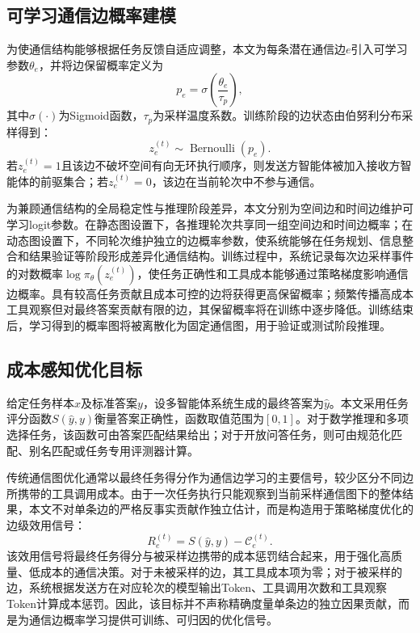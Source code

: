 \subsection{可学习通信边概率建模}

为使通信结构能够根据任务反馈自适应调整，本文为每条潜在通信边$e$引入可学习参数$\theta_e$，并将边保留概率定义为
\begin{equation}
  p_e = \sigma\left(\frac{\theta_e}{\tau_p}\right),
  \label{eq:edge-probability}
\end{equation}
其中$\sigma(\cdot)$为Sigmoid函数，$\tau_p$为采样温度系数。训练阶段的边状态由伯努利分布采样得到：
\begin{equation}
  z_e^{(t)} \sim \operatorname{Bernoulli}(p_e).
  \label{eq:edge-sampling}
\end{equation}
若$z_e^{(t)}=1$且该边不破坏空间有向无环执行顺序，则发送方智能体被加入接收方智能体的前驱集合；若$z_e^{(t)}=0$，该边在当前轮次中不参与通信。

为兼顾通信结构的全局稳定性与推理阶段差异，本文分别为空间边和时间边维护可学习logit参数。在静态图设置下，各推理轮次共享同一组空间边和时间边概率；在动态图设置下，不同轮次维护独立的边概率参数，使系统能够在任务规划、信息整合和结果验证等阶段形成差异化通信结构。训练过程中，系统记录每次边采样事件的对数概率$\log \pi_\theta(z_e^{(t)})$，使任务正确性和工具成本能够通过策略梯度影响通信边概率。具有较高任务贡献且成本可控的边将获得更高保留概率；频繁传播高成本工具观察但对最终答案贡献有限的边，其保留概率将在训练中逐步降低。训练结束后，学习得到的概率图将被离散化为固定通信图，用于验证或测试阶段推理。

\subsection{成本感知优化目标}

给定任务样本$x$及标准答案$y$，设多智能体系统生成的最终答案为$\hat{y}$。本文采用任务评分函数$S(\hat{y},y)$衡量答案正确性，函数取值范围为$[0,1]$。对于数学推理和多项选择任务，该函数可由答案匹配结果给出；对于开放问答任务，则可由规范化匹配、别名匹配或任务专用评测器计算。

传统通信图优化通常以最终任务得分作为通信边学习的主要信号，较少区分不同边所携带的工具调用成本。由于一次任务执行只能观察到当前采样通信图下的整体结果，本文不对单条边的严格反事实贡献作独立估计，而是构造用于策略梯度优化的边级效用信号：
\begin{equation}
  R_e^{(t)} = S(\hat{y},y)-\mathcal{C}_e^{(t)}.
  \label{eq:edge-reward}
\end{equation}
该效用信号将最终任务得分与被采样边携带的成本惩罚结合起来，用于强化高质量、低成本的通信决策。对于未被采样的边，其工具成本项为零；对于被采样的边，系统根据发送方在对应轮次的模型输出Token、工具调用次数和工具观察Token计算成本惩罚。因此，该目标并不声称精确度量单条边的独立因果贡献，而是为通信边概率学习提供可训练、可归因的优化信号。

